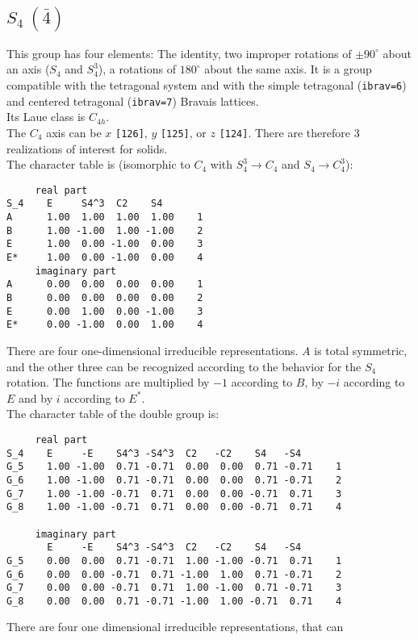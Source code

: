 \documentclass[12pt,a4paper]{article}
\begin{document}
\newpage
\subsection{\color{web-blue}$S_4\ (\bar 4)$}  
This group has four elements: The identity, two improper rotations 
of $\pm90^\circ$ about an axis ($S_4$ and $S_4^3$),  
a rotations of $180^\circ$ about the same axis. 
It is a group compatible with the tetragonal system and with the  
simple tetragonal (\texttt{ibrav=6}) and centered tetragonal 
(\texttt{ibrav=7}) Bravais lattices. \\
Its Laue class is $C_{4h}$. \\
The $C_4$ axis can be $x$ \texttt{[126]}, $y$ \texttt{[125]}, 
or $z$ \texttt{[124]}. There are therefore $3$ realizations
of interest for solids. \\ 
The character table is (isomorphic to $C_4$ with $S_4^3 \rightarrow C_4$ and
$S_4 \rightarrow C_4^3$):
\begin{verbatim}
     real part
S_4    E     S4^3  C2    S4   
A      1.00  1.00  1.00  1.00    1
B      1.00 -1.00  1.00 -1.00    2
E      1.00  0.00 -1.00  0.00    3
E*     1.00  0.00 -1.00  0.00    4
     imaginary part
A      0.00  0.00  0.00  0.00    1
B      0.00  0.00  0.00  0.00    2
E      0.00  1.00  0.00 -1.00    3
E*     0.00 -1.00  0.00  1.00    4
\end{verbatim}
There are four one-dimensional irreducible representations. $A$ is total
symmetric, and the other three can be recognized according to the behavior
for the $S_4$ rotation. The functions are multiplied by $-1$ according to
$B$, by $-i$ according to $E$ and by $i$ according to $E^*$.\\
The character table of the double group is:
\begin{verbatim}
     real part
S_4    E     -E    S4^3 -S4^3  C2   -C2    S4   -S4  
G_5    1.00 -1.00  0.71 -0.71  0.00  0.00  0.71 -0.71    1
G_6    1.00 -1.00  0.71 -0.71  0.00  0.00  0.71 -0.71    2
G_7    1.00 -1.00 -0.71  0.71  0.00  0.00 -0.71  0.71    3
G_8    1.00 -1.00 -0.71  0.71  0.00  0.00 -0.71  0.71    4

     imaginary part
       E     -E    S4^3 -S4^3  C2   -C2    S4   -S4  
G_5    0.00  0.00  0.71 -0.71  1.00 -1.00 -0.71  0.71    1
G_6    0.00  0.00 -0.71  0.71 -1.00  1.00  0.71 -0.71    2
G_7    0.00  0.00 -0.71  0.71  1.00 -1.00  0.71 -0.71    3
G_8    0.00  0.00  0.71 -0.71 -1.00  1.00 -0.71  0.71    4
\end{verbatim}
There are four one dimensional irreducible representations, that can
\end{document}

